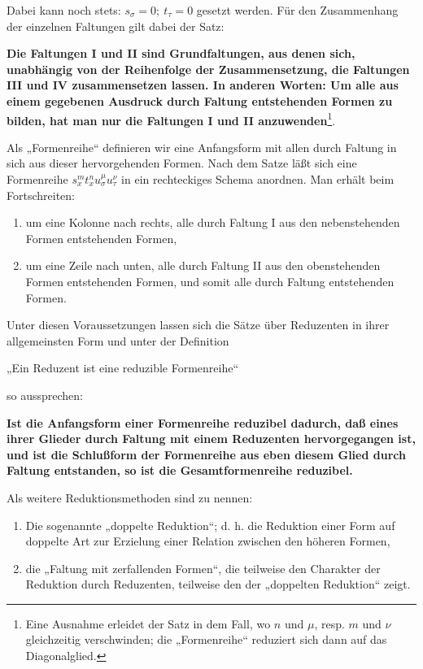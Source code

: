 \documentclass[11pt]{article}
\begin{document}
Dabei kann noch stets: $s_\sigma=0;\ t_\tau=0$ gesetzt werden. Für den Zusammenhang der einzelnen Faltungen gilt dabei der Satz:

\textbf{Die Faltungen I und II sind Grundfaltungen, aus denen sich, unabhängig von der Reihenfolge der Zusammensetzung, die Faltungen III und IV zusammensetzen lassen. In anderen Worten: Um alle aus einem gegebenen Ausdruck durch Faltung entstehenden Formen zu bilden, hat man nur die Faltungen I und II anzuwenden}\footnote{Eine Ausnahme erleidet der Satz in dem Fall, wo $n$ und $\mu$, resp. $m$ und $\nu$ gleichzeitig verschwinden; die „Formenreihe“ reduziert sich dann auf das Diagonalglied.}.

Als „Formenreihe“ definieren wir eine Anfangsform mit allen durch Faltung in sich aus dieser hervorgehenden Formen. Nach dem Satze läßt sich eine Formenreihe $s_x^m t_x^n u_\sigma^\mu u_\tau^\nu$ in ein rechteckiges Schema anordnen. Man erhält beim Fortschreiten:
\begin{enumerate}
\item um eine Kolonne nach rechts, alle durch Faltung I aus den nebenstehenden Formen entstehenden Formen,
\item um eine Zeile nach unten, alle durch Faltung II aus den obenstehenden Formen entstehenden Formen, und somit alle durch Faltung entstehenden Formen.
\end{enumerate}

Unter diesen Voraussetzungen lassen sich die Sätze über Reduzenten in ihrer allgemeinsten Form und unter der Definition
\begin{center}
„Ein Reduzent ist eine reduzible Formenreihe“
\end{center}
so aussprechen:

\begin{center}
\textbf{Ist die Anfangsform einer Formenreihe reduzibel dadurch, daß eines ihrer Glieder durch Faltung mit einem Reduzenten hervorgegangen ist, und ist die Schlußform der Formenreihe aus eben diesem Glied durch Faltung entstanden, so ist die Gesamtformenreihe reduzibel.}
\end{center}

Als weitere Reduktionsmethoden sind zu nennen:
\begin{enumerate}
\item Die sogenannte „doppelte Reduktion“; d. h. die Reduktion einer Form auf doppelte Art zur Erzielung einer Relation zwischen den höheren Formen,
\item die „Faltung mit zerfallenden Formen“, die teilweise den Charakter der Reduktion durch Reduzenten, teilweise den der „doppelten Reduktion“ zeigt.
\end{enumerate}
\clearpage
\end{document}
